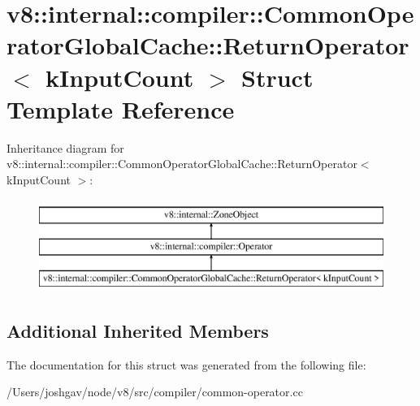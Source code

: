 \hypertarget{structv8_1_1internal_1_1compiler_1_1_common_operator_global_cache_1_1_return_operator}{}\section{v8\+:\+:internal\+:\+:compiler\+:\+:Common\+Operator\+Global\+Cache\+:\+:Return\+Operator$<$ k\+Input\+Count $>$ Struct Template Reference}
\label{structv8_1_1internal_1_1compiler_1_1_common_operator_global_cache_1_1_return_operator}
Inheritance diagram for v8\+:\+:internal\+:\+:compiler\+:\+:Common\+Operator\+Global\+Cache\+:\+:Return\+Operator$<$ k\+Input\+Count $>$\+:\begin{figure}[H]
\begin{center}
\leavevmode
\includegraphics[height=3.000000cm]{structv8_1_1internal_1_1compiler_1_1_common_operator_global_cache_1_1_return_operator}
\end{center}
\end{figure}
\subsection*{Additional Inherited Members}


The documentation for this struct was generated from the following file\+:\begin{DoxyCompactItemize}
\item 
/\+Users/joshgav/node/v8/src/compiler/common-\/operator.\+cc\end{DoxyCompactItemize}
